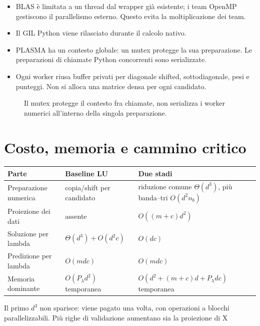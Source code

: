 \documentclass[11pt,a4paper]{article}
\newcommand{\page}[1]{\clearpage\section{#1}}
\begin{document}
\begin{itemize}
\item BLAS è limitata a un thread dal wrapper già esistente; i team OpenMP
  gestiscono il parallelismo esterno. Questo evita la moltiplicazione dei team.
\item Il GIL Python viene rilasciato durante il calcolo nativo.
\item PLASMA ha un contesto globale: un mutex protegge la sua preparazione.
  Le preparazioni di chiamate Python concorrenti sono serializzate.
\item Ogni worker riusa buffer privati per diagonale shifted, sottodiagonale,
  pesi e punteggi. Non si alloca una matrice densa per ogni candidato.
\end{itemize}
\begin{figure}[H]\centering
{}
\caption{Il mutex protegge il contesto fra chiamate, non serializza i worker numerici all'interno della singola preparazione.}
\end{figure}
\page{Costo, memoria e cammino critico}
\begin{center}\small\begin{tabularx}{\linewidth}{lXX}\toprule
Parte&Baseline LU&Due stadi\\\midrule
Preparazione numerica&copia/shift per candidato&riduzione comune $\Theta(d^3)$, più banda--tri $O(d^2n_b)$\\
Proiezione dei dati&assente&$O((m+c)d^2)$\\
Soluzione per lambda&$\Theta(d^3)+O(d^2c)$&$O(dc)$\\
Predizione per lambda&$O(mdc)$&$O(mdc)$\\
Memoria dominante&$O(P_\lambda d^2)$ temporanea&$O(d^2+(m+c)d+P_\lambda dc)$ temporanea\\\bottomrule
\end{tabularx}\end{center}
Il primo $d^3$ non sparisce: viene pagato una volta, con operazioni a blocchi
parallelizzabili. Più righe di validazione aumentano sia la proiezione di X
\end{document}
